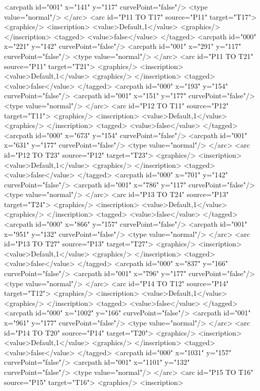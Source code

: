<arcpath id="001" x="141" y="117" curvePoint="false"/>
<type value="normal"/>
</arc>
<arc id="P11 TO T17" source="P11" target="T17">
<graphics/>
<inscription>
<value>Default,1</value>
<graphics/>
</inscription>
<tagged>
<value>false</value>
</tagged>
<arcpath id="000" x="221" y="142" curvePoint="false"/>
<arcpath id="001" x="291" y="117" curvePoint="false"/>
<type value="normal"/>
</arc>
<arc id="P11 TO T21" source="P11" target="T21">
<graphics/>
<inscription>
<value>Default,1</value>
<graphics/>
</inscription>
<tagged>
<value>false</value>
</tagged>
<arcpath id="000" x="193" y="154" curvePoint="false"/>
<arcpath id="001" x="151" y="177" curvePoint="false"/>
<type value="normal"/>
</arc>
<arc id="P12 TO T11" source="P12" target="T11">
<graphics/>
<inscription>
<value>Default,1</value>
<graphics/>
</inscription>
<tagged>
<value>false</value>
</tagged>
<arcpath id="000" x="673" y="154" curvePoint="false"/>
<arcpath id="001" x="631" y="177" curvePoint="false"/>
<type value="normal"/>
</arc>
<arc id="P12 TO T23" source="P12" target="T23">
<graphics/>
<inscription>
<value>Default,1</value>
<graphics/>
</inscription>
<tagged>
<value>false</value>
</tagged>
<arcpath id="000" x="701" y="142" curvePoint="false"/>
<arcpath id="001" x="786" y="117" curvePoint="false"/>
<type value="normal"/>
</arc>
<arc id="P13 TO T24" source="P13" target="T24">
<graphics/>
<inscription>
<value>Default,1</value>
<graphics/>
</inscription>
<tagged>
<value>false</value>
</tagged>
<arcpath id="000" x="866" y="157" curvePoint="false"/>
<arcpath id="001" x="951" y="132" curvePoint="false"/>
<type value="normal"/>
</arc>
<arc id="P13 TO T27" source="P13" target="T27">
<graphics/>
<inscription>
<value>Default,1</value>
<graphics/>
</inscription>
<tagged>
<value>false</value>
</tagged>
<arcpath id="000" x="837" y="166" curvePoint="false"/>
<arcpath id="001" x="796" y="177" curvePoint="false"/>
<type value="normal"/>
</arc>
<arc id="P14 TO T12" source="P14" target="T12">
<graphics/>
<inscription>
<value>Default,1</value>
<graphics/>
</inscription>
<tagged>
<value>false</value>
</tagged>
<arcpath id="000" x="1002" y="166" curvePoint="false"/>
<arcpath id="001" x="961" y="177" curvePoint="false"/>
<type value="normal"/>
</arc>
<arc id="P14 TO T20" source="P14" target="T20">
<graphics/>
<inscription>
<value>Default,1</value>
<graphics/>
</inscription>
<tagged>
<value>false</value>
</tagged>
<arcpath id="000" x="1031" y="157" curvePoint="false"/>
<arcpath id="001" x="1101" y="132" curvePoint="false"/>
<type value="normal"/>
</arc>
<arc id="P15 TO T16" source="P15" target="T16">
<graphics/>
<inscription>
